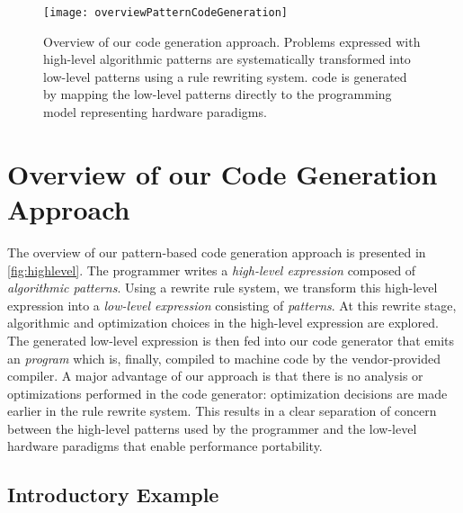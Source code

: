 \begin{figure}[tb]
\centering
\texttt{[image: overviewPatternCodeGeneration]}
\caption[Overview of our code generation approach.]{
Overview of our code generation approach.
Problems expressed with  high-level algorithmic patterns are systematically transformed into low-level \OpenCL patterns using a rule rewriting system.
\OpenCL code is generated by mapping the low-level patterns directly to the \OpenCL programming model representing hardware paradigms.
}
\label{fig:highlevel}
\end{figure}

\section{Overview of our Code Generation Approach}
\label{section:code-generation:overview}

The overview of our pattern-based code generation approach is presented in \autoref{fig:highlevel}.
The programmer writes a \emph{high-level expression} composed of \emph{algorithmic patterns}.
Using a rewrite rule system, we transform this high-level expression into a \emph{low-level expression} consisting of \emph{\OpenCL patterns}.
At this rewrite stage, algorithmic and optimization choices in the high-level expression are explored.
The generated low-level expression is then fed into our code generator that emits an \emph{\OpenCL program} which is, finally, compiled to machine code by the vendor-provided \OpenCL compiler.
A major advantage of our approach is that there is no analysis or optimizations performed in the code generator:
optimization decisions are made earlier in the rule rewrite system.
This results in a clear separation of concern between the high-level patterns used by the programmer and the low-level hardware paradigms that enable performance portability.


\subsection{Introductory Example}

